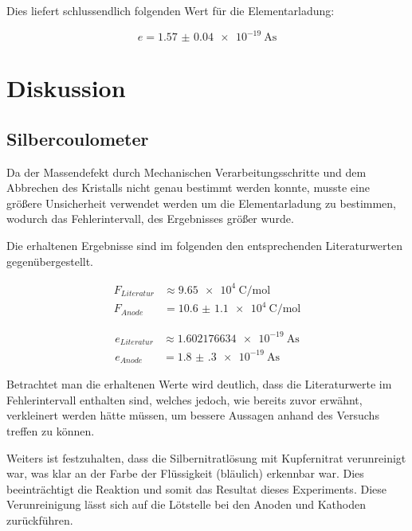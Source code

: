 \documentclass[11pt,ngerman]{scrartcl}
\begin{document}
Dies liefert schlussendlich folgenden Wert für die Elementarladung:

\begin{equation}
	e = \SI{1.57(4)e-19}{\ampere\second}
	\label{eq:elekto_elem}
\end{equation}

\newpage

\section{Diskussion}\label{disk}

\subsection{Silbercoulometer}

Da der Massendefekt durch Mechanischen Verarbeitungsschritte und dem Abbrechen
des Kristalls nicht genau bestimmt werden konnte, musste eine größere Unsicherheit
verwendet werden um die Elementarladung zu bestimmen, wodurch das Fehlerintervall, des Ergebnisses
größer wurde.

\vspace{2mm}

Die erhaltenen Ergebnisse sind im folgenden den entsprechenden Literaturwerten gegenübergestellt.

\begin{align*}
	F_{Literatur} & \approx \SI{9.65e4}{\coulomb\per\mol} \\
	F_{Anode}     & = \SI{10.6(11)e4}{\coulomb\per\mol}
\end{align*}

\begin{align*}
	e_{Literatur} & \approx \SI{1.602176634e-19}{\ampere\second} \\
	e_{Anode}     & = \SI{1.8(3)e-19}{\ampere\second}
\end{align*}

Betrachtet man die erhaltenen Werte wird deutlich, dass die Literaturwerte im Fehlerintervall enthalten sind, welches jedoch, wie bereits zuvor erwähnt, verkleinert werden hätte müssen, um bessere Aussagen anhand des Versuchs treffen zu können.

\vspace{2mm}

Weiters ist festzuhalten, dass die Silbernitratlösung mit Kupfernitrat verunreinigt war, was klar
an der Farbe der Flüssigkeit (bläulich) erkennbar war. Dies beeinträchtigt die Reaktion und somit
das Resultat dieses Experiments. Diese Verunreinigung lässt sich auf die Lötstelle bei den Anoden und Kathoden zurückführen.
\end{document}
